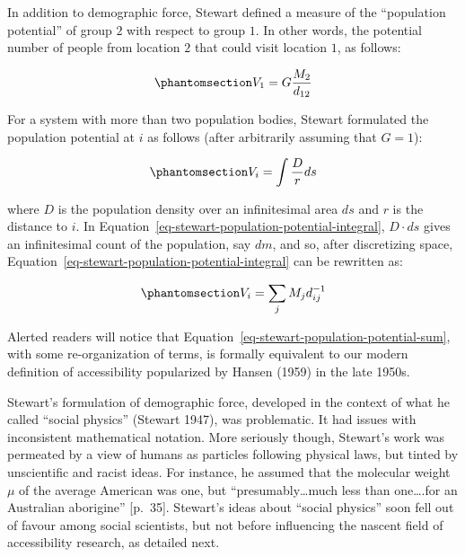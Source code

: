 \documentclass[
]{article}
\begin{document}
In addition to demographic force, Stewart defined a measure of the
``population potential'' of group \(2\) with respect to group \(1\). In
other words, the potential number of people from location \(2\) that
could visit location \(1\), as follows:

\begin{equation}\phantomsection\label{eq-stewart-population-potential}{
V_1 = G\frac{M_2}{d_{12}}
}\end{equation}

For a system with more than two population bodies, Stewart formulated
the population potential at \(i\) as follows (after arbitrarily assuming
that \(G=1\)):

\begin{equation}\phantomsection\label{eq-stewart-population-potential-integral}{
V_i = \int\frac{D}{r} ds
}\end{equation}

\noindent where \(D\) is the population density over an infinitesimal
area \(ds\) and \(r\) is the distance to \(i\). In
Equation~\ref{eq-stewart-population-potential-integral}, \(D\cdot ds\)
gives an infinitesimal count of the population, say \(dm\), and so,
after discretizing space,
Equation~\ref{eq-stewart-population-potential-integral} can be rewritten
as:

\begin{equation}\phantomsection\label{eq-stewart-population-potential-sum}{
V_i = \sum_j M_jd_{ij}^{-1}
}\end{equation}

Alerted readers will notice that
Equation~\ref{eq-stewart-population-potential-sum}, with some
re-organization of terms, is formally equivalent to our modern
definition of accessibility popularized by Hansen (1959) in the late
1950s.

Stewart's formulation of demographic force, developed in the context of
what he called ``social physics'' (Stewart 1947), was problematic. It
had issues with inconsistent mathematical notation. More seriously
though, Stewart's work was permeated by a view of humans as particles
following physical laws, but tinted by unscientific and racist ideas.
For instance, he assumed that the molecular weight \(\mu\) of the
average American was one, but ``presumably\ldots much less than
one\ldots.for an Australian aborigine'' {[}p.~35{]}. Stewart's ideas
about ``social physics'' soon fell out of favour among social
scientists, but not before influencing the nascent field of
accessibility research, as detailed next.
\end{document}
